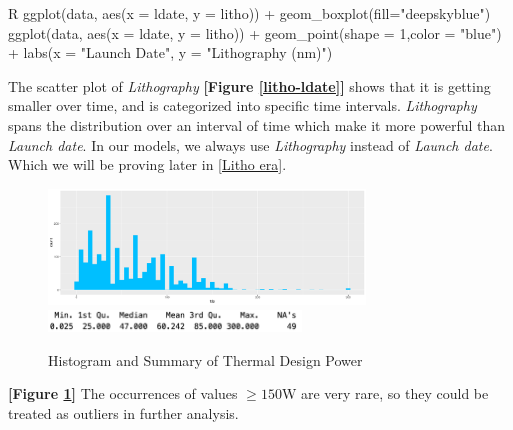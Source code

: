 \begin{code}{R}
ggplot(data, aes(x = ldate, y = litho)) +
  geom_boxplot(fill="deepskyblue")
ggplot(data, aes(x = ldate, y = litho)) +
    geom_point(shape = 1,color = "blue") +
    labs(x = "Launch Date", y = "Lithography (nm)")
\end{code}

The scatter plot of \textit{Lithography} \textbf{[Figure \ref{litho-ldate}]} 
shows that it is getting smaller over time, and is categorized into specific time intervals.
\textit{Lithography} spans the distribution over an interval of time which make it more powerful than \textit{Launch date}. In our
models, we always use \textit{Lithography} instead of \textit{Launch date}. Which we will be proving later in \ref{Litho era}.









\begin{figure}[H]
    \centering
    \includegraphics[width=0.75\textwidth]{./graphics/hist_tdp.pdf}
    \includegraphics[width=0.6\textwidth]{./graphics/sum_tdp.png}
    \caption{Histogram and Summary of Thermal Design Power}
    \label{fig:hist_tdp}
\end{figure}


\textbf{[Figure \ref{fig:hist_tdp}]} The occurrences of values $$W are very rare, 
so they could be treated as outliers in further analysis.









